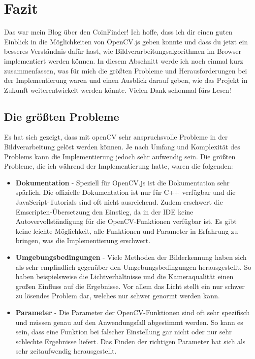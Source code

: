 \section{Fazit}

Das war mein Blog über den CoinFinder! Ich hoffe, dass ich dir einen guten Einblick in die Möglichkeiten von OpenCV.js geben konnte und dass du jetzt ein besseres Verständnis dafür hast, wie Bildverarbeitungsalgorithmen im Browser implementiert werden können. In diesem Abschnitt werde ich noch einmal kurz zusammenfassen, was für mich die größten Probleme und Herausforderungen bei der Implementierung waren und einen Ausblick darauf geben, wie das Projekt in Zukunft weiterentwickelt werden könnte. Vielen Dank schonmal fürs Lesen!

\subsection{Die größten Probleme}
Es hat sich gezeigt, dass mit openCV sehr anspruchsvolle Probleme in der Bildverarbeitung gelöst werden können. Je nach Umfang und Komplexität des Problems kann die Implementierung jedoch sehr aufwendig sein. Die größten Probleme, die ich während der Implementierung hatte, waren die folgenden:

\begin{itemize}
    \item \textbf{Dokumentation} - Speziell für OpenCV.js ist die Dokumentation sehr spärlich. Die offizielle Dokumentation ist nur für C++ verfügbar und die JavaScript-Tutorials sind oft nicht ausreichend. Zudem erschwert die Emscripten-Übersetzung den Einstieg, da in der IDE keine Autovervollständigung für die OpenCV-Funktionen verfügbar ist. Es gibt keine leichte Möglichkeit, alle Funktionen und Parameter in Erfahrung zu bringen, was die Implementierung erschwert.
    \item \textbf{Umgebungsbedingungen} - Viele Methoden der Bilderkennung haben sich als sehr empfindlich gegenüber den Umgebungsbedingungen herausgestellt. So haben beispielsweise die Lichtverhältnisse und die Kameraqualität einen großen Einfluss auf die Ergebnisse. Vor allem das Licht stellt ein nur schwer zu lösendes Problem dar, welches nur schwer \glqq genormt\grqq{} werden kann. 
    \item \textbf{Parameter} - Die Parameter der OpenCV-Funktionen sind oft sehr spezifisch und müssen genau auf den Anwendungsfall abgestimmt werden. So kann es sein, dass eine Funktion bei falscher Einstellung gar nicht oder nur sehr schlechte Ergebnisse liefert. Das Finden der richtigen Parameter hat sich als sehr zeitaufwendig herausgestellt.
\end{itemize}

